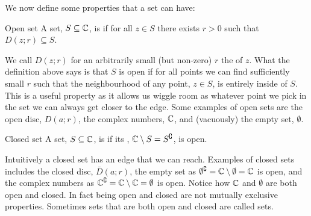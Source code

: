 \documentclass{article}
\newcommand{\discOpen}[2]{D\left({#1}; {#2}\right)}
\newcommand{\discClosed}[2]{\bar{D}\left({#1}; {#2}\right)}
\begin{document}
    We now define some properties that a set can have:
    \begin{definition}{Open set}{}
        A set, \(S\subseteq\mathbb{C}\), is  if for all \(z\in S\) there exists \(r > 0\) such that \(\discOpen{z}{r} \subseteq S\).
    \end{definition}
    We call \(D(z; r)\) for an arbitrarily small (but non-zero) \(r\) the  of \(z\).
    What the definition above says is that \(S\) is open if for all points we can find sufficiently small \(r\) such that the neighbourhood of any point, \(z\in S\), is entirely inside of \(S\).
    This is a useful property as it allows us wiggle room as whatever point we pick in the set we can always get closer to the edge.
    Some examples of open sets are the open disc, \(\discOpen{a}{r}\), the complex numbers, \(\mathbb{C}\), and (vacuously) the empty set, \(\emptyset\).
    
    \begin{definition}{Closed set}{}
        A set, \(S\subseteq\mathbb{C}\), is  if its , \(\mathbb{C}\setminus S = S^\complement\), is open.
    \end{definition}
    Intuitively a closed set has an edge that we can reach.
    Examples of closed sets includes the closed disc, \(\discClosed{a}{r}\), the empty set as \(\emptyset^\complement = \mathbb{C}\setminus\emptyset = \mathbb{C}\) is open, and the complex numbers as \(\mathbb{C}^\complement = \mathbb{C}\setminus\mathbb{C} = \emptyset\) is open.
    Notice how \(\mathbb{C}\) and \(\emptyset\) are both open and closed.
    In fact being open and closed are not mutually exclusive properties.
    Sometimes sets that are both open and closed are called  sets.
    
\end{document}
